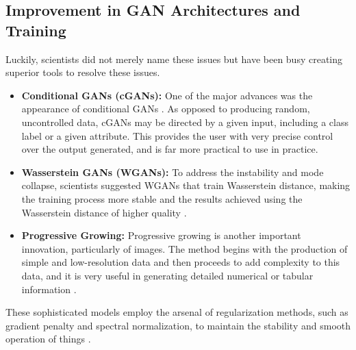 \documentclass[12pt, draftclsnofoot, onecolumn]{IEEEtran}
\begin{document}
\subsection{Improvement in GAN Architectures and Training}
Luckily, scientists did not merely name these issues but have been busy creating superior tools to resolve these issues.
\begin{itemize}
    \item \textbf{Conditional GANs (cGANs):} One of the major advances was the appearance of conditional GANs \cite{ref15,ref5}. As opposed to producing random, uncontrolled data, cGANs may be directed by a given input, including a class label or a given attribute. This provides the user with very precise control over the output generated, and is far more practical to use in practice.
  
    \item \textbf{Wasserstein GANs (WGANs):} To address the instability and mode collapse, scientists suggested WGANs that train Wasserstein distance, making the training process more stable and the results achieved using the Wasserstein distance of higher quality \cite{ref15,ref17}.
    \item \textbf{Progressive Growing:} Progressive growing is another important innovation, particularly of images. The method begins with the production of simple and low-resolution data and then proceeds to add complexity to this data, and it is very useful in generating detailed numerical or tabular information \cite{ref14,ref16}.
\end{itemize}
These sophisticated models employ the arsenal of regularization methods, such as gradient penalty  and spectral normalization, to maintain the stability and smooth operation of things \cite{ref18}.
\end{document}
